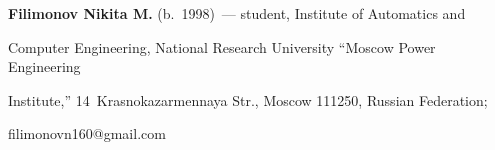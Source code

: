 \vspace*{3pt}





\noindent


\textbf{Filimonov Nikita M.} (b.\ 1998)~--- student, Institute of Automatics and 


Computer Engineering, National Research University ``Moscow Power Engineering 


Institute,'' 14~Krasnokazarmennaya Str., Moscow 111250, Russian Federation; 


\mbox{filimonovn160@gmail.com}


\label{end\stat}





\renewcommand{\bibname}{\protect\rm Литература} 


